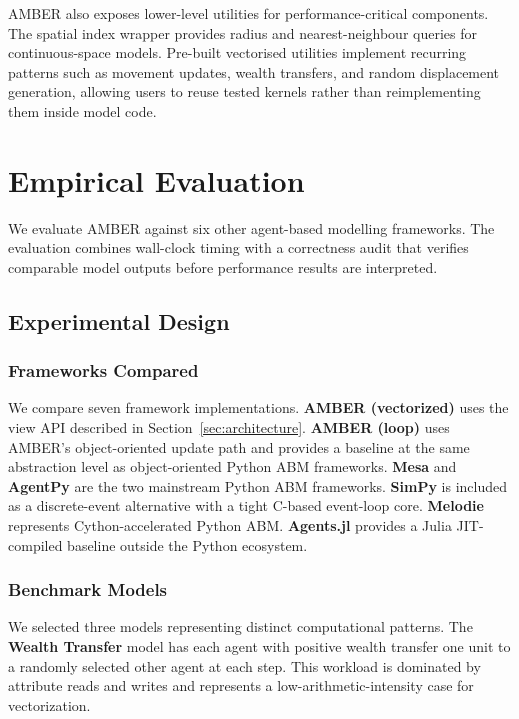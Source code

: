 \documentclass[11pt,a4paper]{article}
\begin{document}
AMBER also exposes lower-level utilities for performance-critical components. The spatial index wrapper provides radius and nearest-neighbour queries for continuous-space models. Pre-built vectorised utilities implement recurring patterns such as movement updates, wealth transfers, and random displacement generation, allowing users to reuse tested kernels rather than reimplementing them inside model code.

\section{Empirical Evaluation}
\label{sec:evaluation}

We evaluate AMBER against six other agent-based modelling frameworks. The evaluation combines wall-clock timing with a correctness audit that verifies comparable model outputs before performance results are interpreted.

\subsection{Experimental Design}

\subsubsection{Frameworks Compared}

We compare seven framework implementations. \textbf{AMBER (vectorized)} uses the view API described in Section~\ref{sec:architecture}. \textbf{AMBER (loop)} uses AMBER's object-oriented update path and provides a baseline at the same abstraction level as object-oriented Python ABM frameworks. \textbf{Mesa} \citep{masad2015mesa} and \textbf{AgentPy} \citep{foramitti2021agentpy} are the two mainstream Python ABM frameworks. \textbf{SimPy} \citep{zinoviev2024discrete} is included as a discrete-event alternative with a tight C-based event-loop core. \textbf{Melodie} \citep{yu2023melodie} represents Cython-accelerated Python ABM. \textbf{Agents.jl} \citep{datseris2024agents} provides a Julia JIT-compiled baseline outside the Python ecosystem.

\subsubsection{Benchmark Models}

We selected three models representing distinct computational patterns. The \textbf{Wealth Transfer} model has each agent with positive wealth transfer one unit to a randomly selected other agent at each step. This workload is dominated by attribute reads and writes and represents a low-arithmetic-intensity case for vectorization.
\end{document}
